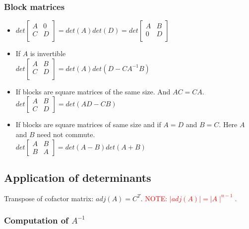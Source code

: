 \subsubsection{Block matrices}

\begin{itemize}
\item 
$det
\begin{bmatrix}
A & 0 \\
C & D\\ 
\end{bmatrix}
= det(A) det(D) = 
det
\begin{bmatrix}
A & B\\
0 & D\\
\end{bmatrix}
$
\item If $A$ is invertible\\
$
det
\begin{bmatrix}
A & B\\
C & D\\
\end{bmatrix}
 = det(A)det(D - CA^{-1}B)
$
\item If blocks are square matrices of the same size. And $AC = CA$.\\
$det
\begin{bmatrix}
A & B\\
C & D
\end{bmatrix}
 = det(AD - CB)
$

\item If blocks are square matrices of same size and if $A = D$ and $B = C$. Here $A$ and $B$ need not commute.\\
$
det
\begin{bmatrix}
A & B\\
B & A
\end{bmatrix}
 = det(A - B)det(A + B)
$
\end{itemize}

 
\subsection{Application of determinants}


\begin{definition}
Transpose of cofactor matrix: $adj(A) = C^T$.
\textcolor{red}{NOTE: $\mid adj(A) \mid = \mid A \mid ^ {n-1}$.}
\end{definition}

\subsubsection{Computation of $A^{-1}$}



